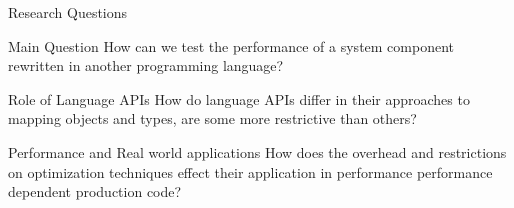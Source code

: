 
\begin{frame}{Research Questions}
    \begin{block}{Main Question}
        How can we test the performance of a system component rewritten in another programming language?
    \end{block}

    \pause

    \begin{block}{Role of Language APIs}
        How do language APIs differ in their approaches to mapping objects and types, are some more restrictive than others?
    \end{block}

    \pause

    \begin{block}{Performance and Real world applications}
        How does the overhead and restrictions on optimization techniques effect their application in performance performance dependent production code?
    \end{block}

\end{frame}